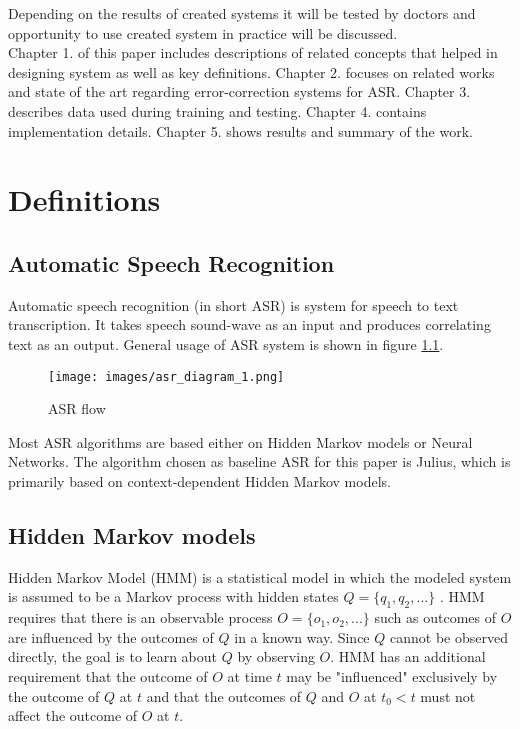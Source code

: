 \documentclass[a4paper,11pt,twoside]{report}
\theoremstyle{definition}
\begin{document}
Depending on the results of created systems it will be tested by doctors and opportunity to use created system in practice will be discussed.\\

Chapter 1. of this paper includes descriptions of related concepts that helped in designing system as well as key definitions. Chapter 2. focuses on related works and state of the art regarding error-correction systems for ASR. Chapter 3. describes data used during training and testing. Chapter 4. contains implementation details. Chapter 5. shows results and summary of the work. 


\chapter{Definitions}

\section{Automatic Speech Recognition}

Automatic speech recognition (in short ASR) is system for speech to text transcription. It takes speech sound-wave as an input and produces correlating text as an output. General usage of ASR system is shown in figure \ref{img:asrworkflow}. 

\begin{figure}[H]{}
    \centering
    \texttt{[image: images/asr\_diagram\_1.png]}
    \caption{ASR flow}
    \label{img:asrworkflow}
\end{figure}


Most ASR algorithms are based either on Hidden Markov models or Neural Networks. The algorithm chosen as baseline ASR for this paper is Julius, which is primarily based on context-dependent Hidden Markov models.

\section{Hidden Markov models}

Hidden Markov Model (HMM) is a statistical model in which the modeled system is assumed to be a Markov process with hidden states $Q=\{ q_1, q_2, ... \}$ \cite{HMM}. HMM requires that there is an observable process $O=\{ o_1, o_2, ... \}$ such as outcomes of $O$ are influenced by the outcomes of $Q$ in a known way. Since $Q$ cannot be observed directly, the goal is to learn about $Q$ by observing $O$. HMM has an additional requirement that the outcome of $O$ at time $t$ may be "influenced" exclusively by the outcome of $Q$ at $t$ and that the outcomes of $Q$ and $O$ at $t_0 < t$ must not affect the outcome of $O$ at $t$. 
\end{document}
